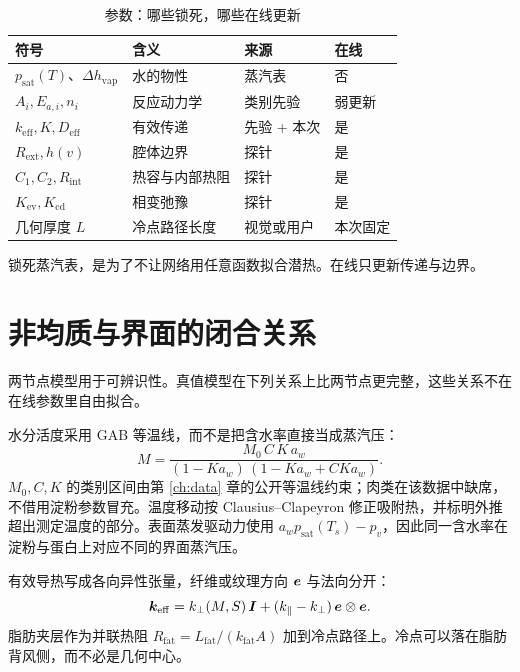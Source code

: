 \begin{table}[H]
\centering
\caption{参数：哪些锁死，哪些在线更新}
\begin{tabularx}{\textwidth}{lXll}
\toprule
符号 & 含义 & 来源 & 在线 \\
\midrule
$p_{\mathrm{sat}}(T)$、$\Delta h_{\mathrm{vap}}$ & 水的物性 & 蒸汽表 & 否 \\
$A_i,E_{a,i},n_i$ & 反应动力学 & 类别先验 & 弱更新 \\
$k_{\mathrm{eff}},K,D_{\mathrm{eff}}$ & 有效传递 & 先验 + 本次 & 是 \\
$R_{\mathrm{ext}},h(v)$ & 腔体边界 & 探针 & 是 \\
$C_1,C_2,R_{\mathrm{int}}$ & 热容与内部热阻 & 探针 & 是 \\
$K_{\mathrm{ev}},K_{\mathrm{cd}}$ & 相变弛豫 & 探针 & 是 \\
几何厚度 $L$ & 冷点路径长度 & 视觉或用户 & 本次固定 \\
\bottomrule
\end{tabularx}
\end{table}

锁死蒸汽表，是为了不让网络用任意函数拟合潜热。在线只更新传递与边界。

\section{非均质与界面的闭合关系}

两节点模型用于可辨识性。真值模型在下列关系上比两节点更完整，这些关系不在在线参数里自由拟合。

水分活度采用 GAB 等温线，而不是把含水率直接当成蒸汽压：
\begin{equation}
\label{eq:gab}
M=\frac{M_0\,C\,K\,a_w}{(1-K a_w)\,(1-K a_w+C K a_w)}.
\end{equation}
$M_0,C,K$ 的类别区间由第 \ref{ch:data} 章的公开等温线约束；肉类在该数据中缺席，不借用淀粉参数冒充。温度移动按 Clausius--Clapeyron 修正吸附热，并标明外推超出测定温度的部分。表面蒸发驱动力使用 $a_w p_{\mathrm{sat}}(T_s)-p_v$，因此同一含水率在淀粉与蛋白上对应不同的界面蒸汽压。

有效导热写成各向异性张量，纤维或纹理方向 $\bm{e}$ 与法向分开：
\begin{equation}
\label{eq:aniso}
\bm{k}_{\mathrm{eff}}=k_\perp(M,S)\,\bm{I}+(k_\parallel-k_\perp)\,\bm{e}\otimes\bm{e}.
\end{equation}
脂肪夹层作为并联热阻 $R_{\mathrm{fat}}=L_{\mathrm{fat}}/(k_{\mathrm{fat}}A)$ 加到冷点路径上。冷点可以落在脂肪背风侧，而不必是几何中心。

